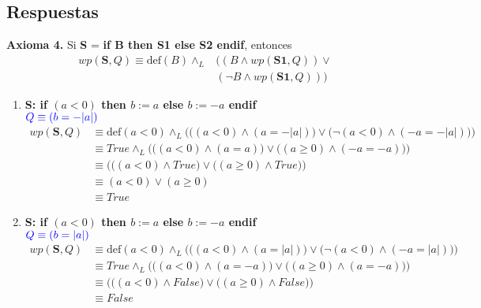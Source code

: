 \documentclass{article}
\begin{document}
\subsection*{Respuestas}
\textbf{Axioma 4.} Si \textbf{S} = \textbf{if B then S1 else S2 endif}, entonces\\
\begin{align*}
wp(\textbf{S},Q)\equiv \textrm{def}(B) \wedge_L &((B\wedge wp(\textbf{S1},Q))\vee \\
												&(\neg B\wedge wp(\textbf{S1},Q)))
\end{align*} 
\begin{enumerate}[label=\alph*)]
	\item 
		\textbf{S: if $( a < 0 )$ then $b := a$ else $b := -a$ endif}\\
   		\hspace*{24mm}$\color{blue}Q \equiv (b = -|a|)$\\
   		\begin{align*}
   			wp(\textbf{S},Q)&\equiv \textrm{def}(a < 0)\wedge_L 
   				\Bigg(\Big((a < 0)\wedge (a=-|a|)\Big) 
   				\vee \Big(\neg  (a < 0)\wedge (-a=-|a|)\Big)\Bigg)\\
   							&\equiv True \wedge_L \Bigg(\Big((a < 0)\wedge (a=a)\Big) 
   								\vee \Big((a\geq 0)\wedge (-a=-a)\Big)\Bigg)\\
   							&\equiv \Bigg(\Big((a < 0)\wedge True\Big) 
   								\vee\Big((a\geq 0)\wedge True\Big)\Bigg)\\
   							&\equiv (a < 0) 
   								\vee(a\geq 0)\\
   							&\equiv True
   		\end{align*}
	\item
		\textbf{S: if $( a < 0 )$ then $b := a$ else $b := -a$ endif}\\
   		\hspace*{24mm}$\color{blue}Q \equiv (b = |a|)$\\
   		\begin{align*}
   			wp(\textbf{S},Q)&\equiv \textrm{def}(a < 0)\wedge_L 
   				\Bigg(\Big((a < 0)\wedge (a=|a|)\Big) 
   					\vee\Big(\neg  (a < 0)\wedge (-a=|a|)\Big)\Bigg)\\
   							&\equiv True \wedge_L \Bigg(\Big((a < 0)\wedge (a=-a)\Big) 
   								\vee \Big((a\geq 0)\wedge (a=-a)\Big)\Bigg)\\
   							&\equiv \Bigg(\Big((a < 0)\wedge False\Big) 
   								\vee\Big((a\geq 0)\wedge False\Big)\Bigg)\\
   							&\equiv False 

\end{align*}
\end{enumerate}
\end{document}
